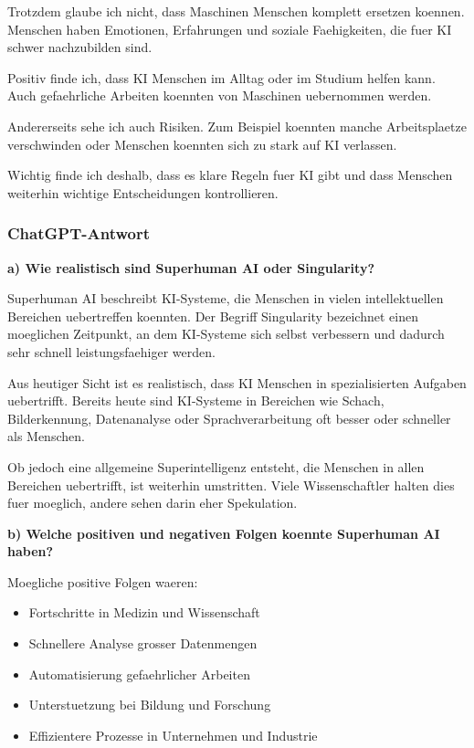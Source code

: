 \documentclass[12pt,a4paper]{article}
\begin{document}
Trotzdem glaube ich nicht,
dass Maschinen Menschen komplett ersetzen koennen.
Menschen haben Emotionen, Erfahrungen und soziale Faehigkeiten,
die fuer KI schwer nachzubilden sind.

Positiv finde ich,
dass KI Menschen im Alltag oder im Studium helfen kann.
Auch gefaehrliche Arbeiten koennten von Maschinen uebernommen werden.

Andererseits sehe ich auch Risiken.
Zum Beispiel koennten manche Arbeitsplaetze verschwinden
oder Menschen koennten sich zu stark auf KI verlassen.

Wichtig finde ich deshalb,
dass es klare Regeln fuer KI gibt
und dass Menschen weiterhin wichtige Entscheidungen kontrollieren.

\subsubsection*{ChatGPT-Antwort}

\textbf{a) Wie realistisch sind Superhuman AI oder Singularity?}

Superhuman AI beschreibt KI-Systeme, die Menschen in vielen intellektuellen
Bereichen uebertreffen koennten. Der Begriff Singularity bezeichnet einen
moeglichen Zeitpunkt, an dem KI-Systeme sich selbst verbessern und dadurch
sehr schnell leistungsfaehiger werden.

Aus heutiger Sicht ist es realistisch, dass KI Menschen in spezialisierten
Aufgaben uebertrifft. Bereits heute sind KI-Systeme in Bereichen wie
Schach, Bilderkennung, Datenanalyse oder Sprachverarbeitung oft besser
oder schneller als Menschen.

Ob jedoch eine allgemeine Superintelligenz entsteht, die Menschen in
allen Bereichen uebertrifft, ist weiterhin umstritten.
Viele Wissenschaftler halten dies fuer moeglich, andere sehen darin
eher Spekulation.

\bigskip

\textbf{b) Welche positiven und negativen Folgen koennte Superhuman AI haben?}

Moegliche positive Folgen waeren:

\begin{itemize}
    \item Fortschritte in Medizin und Wissenschaft
    \item Schnellere Analyse grosser Datenmengen
    \item Automatisierung gefaehrlicher Arbeiten
    \item Unterstuetzung bei Bildung und Forschung
    \item Effizientere Prozesse in Unternehmen und Industrie
\end{itemize}
\end{document}
